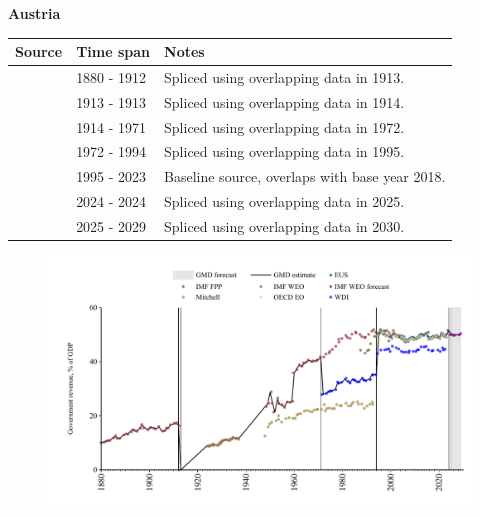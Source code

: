 \documentclass[12pt,a4paper,landscape]{article}
\begin{document}
\begin{adjustbox}{max totalsize={\paperwidth}{\paperheight},center}
\begin{minipage}[t][\textheight][t]{\textwidth}
\vspace*{0.5cm}
{}
\begin{center}
{\Large\bfseries Austria}
\end{center}
\vspace{0.5cm}
\begin{table}[H]
\centering
\small
\begin{tabular}{|l|l|l|}
\hline
\textbf{Source} & \textbf{Time span} & \textbf{Notes} \\
\hline
\rowcolor{white}\cite{IMF_FPP}& 1880 - 1912 &Spliced using overlapping data in 1913.\\
\rowcolor{lightgray}\cite{Mitchell}& 1913 - 1913 &Spliced using overlapping data in 1914.\\
\rowcolor{white}\cite{IMF_FPP}& 1914 - 1971 &Spliced using overlapping data in 1972.\\
\rowcolor{lightgray}\cite{WDI}& 1972 - 1994 &Spliced using overlapping data in 1995.\\
\rowcolor{white}\cite{OECD_EO}& 1995 - 2023 &Baseline source, overlaps with base year 2018.\\
\rowcolor{lightgray}\cite{EUS}& 2024 - 2024 &Spliced using overlapping data in 2025.\\
\rowcolor{white}\cite{IMF_WEO_forecast}& 2025 - 2029 &Spliced using overlapping data in 2030.\\
\hline
\end{tabular}
\end{table}
\begin{figure}[H]
\centering
\includegraphics[width=\textwidth,height=0.6\textheight,keepaspectratio]{graphs/AUT_govrev_GDP.pdf}
\end{figure}
\end{minipage}
\end{adjustbox}
\end{document}
